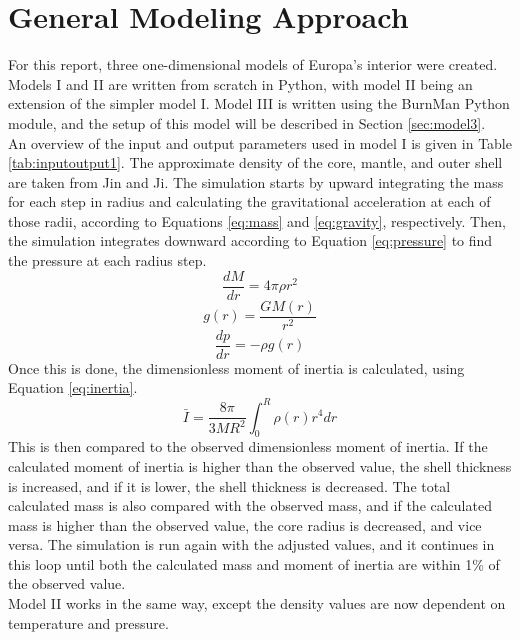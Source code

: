 \documentclass[twocolumn]{article}
\begin{document}
\section{General Modeling Approach}
For this report, three one-dimensional models of Europa's interior were created. Models I and II are written from scratch in Python, with model II being an extension of the simpler model I. Model III is written using the BurnMan Python module, and the setup of this model will be described in Section \ref{sec:model3}.\\
An overview of the input and output parameters used in model I is given in Table \ref{tab:inputoutput1}. The approximate density of the core, mantle, and outer shell are taken from Jin and Ji\cite{jinInternalStructureModels2012}. The simulation starts by upward integrating the mass for each step in radius and calculating the gravitational acceleration at each of those radii, according to Equations \ref{eq:mass} and \ref{eq:gravity}, respectively. Then, the simulation integrates downward according to Equation \ref{eq:pressure} to find the pressure at each radius step.
\begin{equation}
	\label{eq:mass}
	\frac{dM}{dr} = 4\pi\rho r^2
\end{equation}
\begin{equation}
	\label{eq:gravity}
	g(r) = \frac{GM(r)}{r^2}
\end{equation}
\begin{equation}
	\label{eq:pressure}
	\frac{dp}{dr} = -\rho g(r)
\end{equation}
Once this is done, the dimensionless moment of inertia is calculated, using Equation \ref{eq:inertia}.
\begin{equation}
	\label{eq:inertia}
	\bar{I} = \frac{8\pi}{3MR^2}\int_{0}^{R}\rho(r)r^4dr
\end{equation}
This is then compared to the observed dimensionless moment of inertia. If the calculated moment of inertia is higher than the observed value, the shell thickness is increased, and if it is lower, the shell thickness is decreased. The total calculated mass is also compared with the observed mass, and if the calculated mass is higher than the observed value, the core radius is decreased, and vice versa. The simulation is run again with the adjusted values, and it continues in this loop until both the calculated mass and moment of inertia are within 1\% of the observed value.\\
Model II works in the same way, except the density values are now dependent on temperature and pressure.
\end{document}
